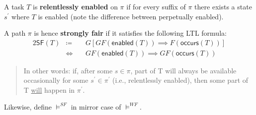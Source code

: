 \documentclass[99-notes-packed.tex]{subfiles}
\begin{document}
\begin{definition}
    A task $T$ is \textbf{relentlessly enabled} on $\pi$ if for every suffix of $\pi$ there exists a state $s^{'}$ where $T$ is enabled (note the difference between perpetually enabled). 

    A path $\pi$ is hence \textbf{strongly fair} if it satisfies the following LTL formula: 
    \begin{alignat*}{2}
        \mathsf{SF}(T) &\coloneqq\ && G[GF(\mathsf{enabled}(T)) \implies F(\mathsf{occurs}(T))] \\
        &\Leftrightarrow\ && GF(\mathsf{enabled}(T)) \implies GF(\mathsf{occurs}(T))
    \end{alignat*}

    \begin{quote}
        In other words: if, after some $s \in \pi$, part of T will always be available occasionally for some $s^{'} \in \pi^{'}$ (i.e., relentlessly enabled), then some part of T \underline{will} happen in $\pi^{'}$. 
    \end{quote}
    
    Likewise, define $\models^{SF}$ in mirror case of $\models^{WF}$. 
\end{definition}
\end{document}
